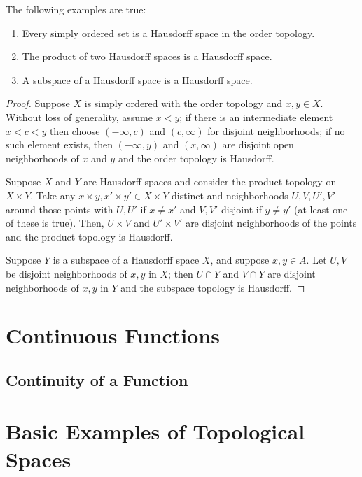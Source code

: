\documentclass[10pt]{report}
\begin{document}
\begin{theorem}
  The following examples are true:
  \begin{enumerate}[label={(\alph*)}]
    \item Every simply ordered set is a Hausdorff space in the order topology.
    \item The product of two Hausdorff spaces is a Hausdorff space.
    \item A subspace of a Hausdorff space is a Hausdorff space.
 \end{enumerate}
\end{theorem}
\begin{proof}
  Suppose $X$ is simply ordered with the order topology and $x,y \in X$.
  Without loss of generality, assume $x < y$; if there is an intermediate element $x < c < y$ then choose $(-\infty,c)$ and $(c,\infty)$ for disjoint neighborhoods; if no such element exists, then $(-\infty,y)$ and $(x,\infty)$ are disjoint open neighborhoods of $x$ and $y$ and the order topology is Hausdorff.

  Suppose $X$ and $Y$ are Hausdorff spaces and consider the product topology on $X \times Y$.
  Take any $x \times y , x' \times y' \in X \times Y$ distinct and neighborhoods $U,V,U',V'$ around those points with $U,U'$ if $x \neq x'$ and $V,V'$ disjoint if $y \neq y'$ (at least one of these is true).
  Then, $U \times V$ and $U' \times V'$ are disjoint neighborhoods of the points and the product topology is Hausdorff.

  Suppose $Y$ is a subspace of a Hausdorff space $X$, and suppose $x,y \in A$.
  Let $U,V$ be disjoint neighborhoods of $x,y$ in $X$;
  then $U \cap Y$ and $V \cap Y$ are disjoint neighborhoods of $x,y$ in $Y$ and the subspace topology is Hausdorff.
\end{proof}

\section{Continuous Functions}
\subsection{Continuity of a Function}

\section{Basic Examples of Topological Spaces}
\end{document}
